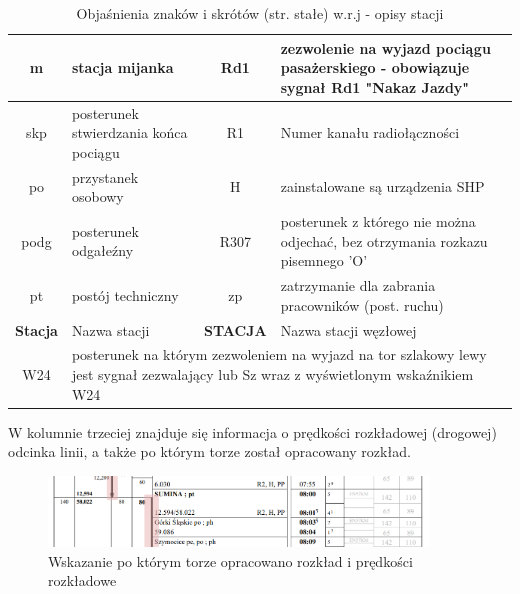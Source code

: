 \begin{table}
	\begin{tabular}{|c|m{4cm}|c|m{4cm}|}
		\hline 
		m & stacja mijanka & Rd1 & zezwolenie na wyjazd pociągu pasażerskiego - obowiązuje sygnał Rd1 "Nakaz Jazdy" \\ 
		\hline
		skp & posterunek stwierdzania końca pociągu & R1& Numer kanału radiołączności\\ 
		\hline
		po	& przystanek osobowy & H & zainstalowane są urządzenia SHP\\ 
		\hline
		podg	& posterunek odgałeźny &  R307	& posterunek z którego nie można odjechać, bez otrzymania rozkazu pisemnego 'O'\\ 
		\hline
		pt	& postój techniczny & zp & zatrzymanie dla zabrania pracowników (post. ruchu)\\ 
		\hline
		\textbf{Stacja}	& Nazwa stacji & \textbf{STACJA} & Nazwa stacji węzłowej \\ 
		\hline
		W24	& \multicolumn{3}{m{9cm}|}{posterunek na którym zezwoleniem na wyjazd na tor szlakowy lewy jest sygnał zezwalający lub Sz wraz z wyświetlonym wskaźnikiem W24} \\
		\hline
	\end{tabular} 
	\caption{Objaśnienia znaków i skrótów (str. stałe) w.r.j - opisy stacji}
\end{table}
W kolumnie trzeciej znajduje się informacja o prędkości rozkładowej (drogowej) odcinka linii, a także po którym torze został opracowany rozkład.
\begin{figure}
	\includegraphics[width=0.9\textwidth]{skryptkierownik-img/tor-lewy.png}
	\caption{Wskazanie po którym torze opracowano rozkład i prędkości rozkładowe}
\end{figure}

